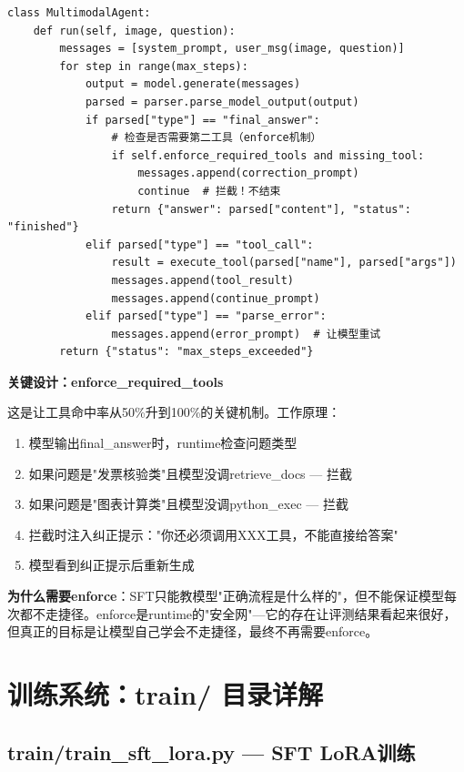 \documentclass[fontset=none,11pt,a4paper]{ctexart}
\begin{document}
\begin{lstlisting}
class MultimodalAgent:
    def run(self, image, question):
        messages = [system_prompt, user_msg(image, question)]
        for step in range(max_steps):
            output = model.generate(messages)
            parsed = parser.parse_model_output(output)
            if parsed["type"] == "final_answer":
                # 检查是否需要第二工具（enforce机制）
                if self.enforce_required_tools and missing_tool:
                    messages.append(correction_prompt)
                    continue  # 拦截！不结束
                return {"answer": parsed["content"], "status": "finished"}
            elif parsed["type"] == "tool_call":
                result = execute_tool(parsed["name"], parsed["args"])
                messages.append(tool_result)
                messages.append(continue_prompt)
            elif parsed["type"] == "parse_error":
                messages.append(error_prompt)  # 让模型重试
        return {"status": "max_steps_exceeded"}
\end{lstlisting}

\textbf{关键设计：enforce\_required\_tools}

这是让工具命中率从50\%升到100\%的关键机制。工作原理：

\begin{enumerate}[nosep]
    \item 模型输出final\_answer时，runtime检查问题类型
    \item 如果问题是"发票核验类"且模型没调retrieve\_docs --- 拦截
    \item 如果问题是"图表计算类"且模型没调python\_exec --- 拦截
    \item 拦截时注入纠正提示："你还必须调用XXX工具，不能直接给答案"
    \item 模型看到纠正提示后重新生成
\end{enumerate}

\textbf{为什么需要enforce}：SFT只能教模型"正确流程是什么样的"，但不能保证模型每次都不走捷径。enforce是runtime的"安全网"---它的存在让评测结果看起来很好，但真正的目标是让模型自己学会不走捷径，最终不再需要enforce。

\newpage

\section{训练系统：train/ 目录详解}

\subsection{train/train\_sft\_lora.py --- SFT LoRA训练}
\end{document}
